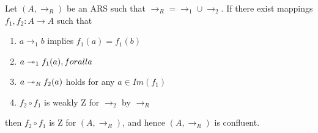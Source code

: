     \begin{theorem}\label{cor:zcomp} Let
     $(A,\to_R)$ be an ARS such that $\to_R = \to_1 \cup \to_2$. If
     there exist mappings $f_1,f_2: A \to A$ such that
     \begin{enumerate} \item $a \to_1 b$ implies $f_1(a) = f_1(b)$
     \item $a \twoheadrightarrow_1 f_1(a), for all a$ \item $a \twoheadrightarrow_R f_2(a)$ holds
     for any $a\in Im(f_1)$ \item $f_2 \circ f_1$ is weakly Z for
     $\to_2$ by $\to_R$ \end{enumerate} then $f_2 \circ f_1$ is Z for
     $(A,\to_R)$, and hence $(A,\to_R)$ is confluent. \end{theorem}


